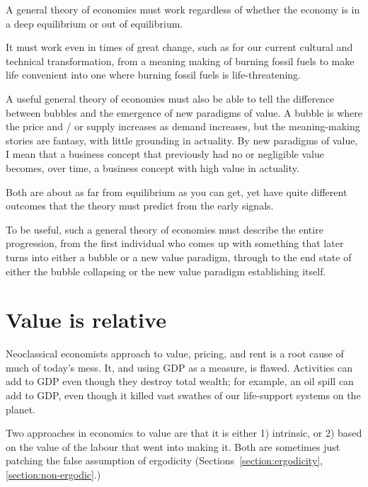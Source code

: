A general theory of economies must work regardless of whether the economy is in a deep equilibrium or out of equilibrium.


It must work even in times of great change, such as for our current cultural and technical transformation, from a meaning making of burning fossil fuels  to make life convenient into one where burning fossil fuels is life-threatening.


A useful general theory of economies must also be able to tell the difference between bubbles\cite{carlin-macroeconomics}  and the emergence of new paradigms of value. A bubble is where the price and / or supply increases as demand increases, but the meaning-making stories are fantasy, with little grounding in actuality. By new paradigms of value, I mean that a business concept that previously had no or negligible value becomes, over time, a business concept with high value in actuality.


Both are about as far from equilibrium as you can get, yet have quite different outcomes that the theory must predict from the early signals. 


To be useful, such a general theory of economies must describe the entire progression, from the first individual who comes up with something that later turns into either a bubble or a new value paradigm, through to the end state of either the bubble collapsing or the new value paradigm establishing itself.








\section{Value is relative}


Neoclassical economists approach to value, pricing, and rent is a root cause of much of today’s mess\cite{mazzucato-value-everything}.  It, and using GDP as a measure, is flawed. Activities can add to GDP even though they destroy total wealth; for example, an oil spill can add to GDP, even though it killed vast swathes of our life-support systems on the planet. 


Two approaches in economics to value are that it is either 1) intrinsic, or 2) based on the value of the labour that went into making it. Both are sometimes just patching the false assumption of ergodicity (Sections~\ref{section:ergodicity}, \ref{section:non-ergodic}.)


